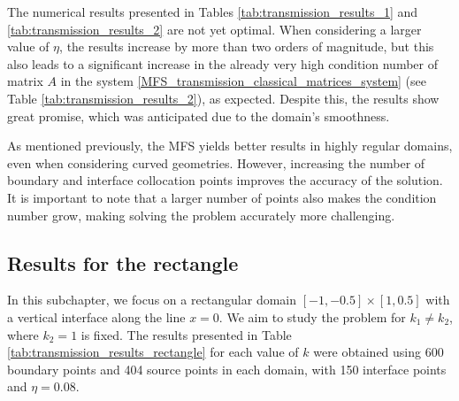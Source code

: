 The numerical results presented in Tables \ref{tab:transmission_results_1} and \ref{tab:transmission_results_2} are not yet optimal. When considering a larger value of \(\eta\), the results increase by more than two orders of magnitude, but this also leads to a significant increase in the already very high condition number of matrix \(A\) in the system \eqref{MFS_transmission_classical_matrices_system} (see Table \ref{tab:transmission_results_2}), as expected. Despite this, the results show great promise, which was anticipated due to the domain's smoothness.

As mentioned previously, the \ac{MFS} yields better results in highly regular domains, even when considering curved geometries. However, increasing the number of boundary and interface collocation points improves the accuracy of the solution. It is important to note that a larger number of points also makes the condition number grow, making solving the problem accurately more challenging.


\subsection{Results for the rectangle}

In this subchapter, we focus on a rectangular domain \([-1, -0.5] \times [1, 0.5]\) with a vertical interface along the line \(x=0\). We aim to study the problem for \(k_1 \neq k_2\), where \(k_2=1\) is fixed. The results presented in Table \ref{tab:transmission_results_rectangle} for each value of \(k\) were obtained using 600 boundary points and 404 source points in each domain, with 150 interface points and \(\eta=0.08\).

